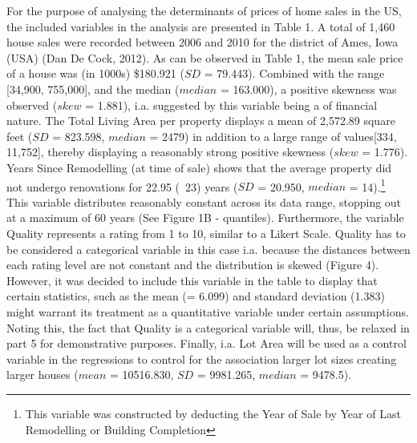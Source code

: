\documentclass[a4paper]{article}
\begin{document}
For the purpose of analysing the determinants of prices of home sales in the US, the included variables in the analysis are presented in Table 1. A total of 1,460 house sales were recorded between 2006 and 2010 for the district of Ames, Iowa (USA) (Dan De Cock, 2012). As can be observed in Table 1, the mean sale price of a house was (in 1000s) \$180.921 ($SD$ = 79.443). Combined with the range [34,900, 755,000], and the median ($median$ = 163.000), a positive skewness was observed ($skew$ = 1.881), i.a. suggested by this variable being a of financial nature. The Total Living Area per property displays a mean of 2,572.89 square feet ($SD$ = 823.598, $median$ = 2479) in addition to a large range of values[334, 11,752], thereby displaying a reasonably strong positive skewness ($skew$ = 1.776).  Years Since Remodelling (at time of sale) shows that the average property did not undergo renovations for 22.95 (~23) years ($SD$ = 20.950, $median$ = 14).\footnote{This variable was constructed by deducting the Year of Sale by Year of Last Remodelling or Building Completion} This variable distributes reasonably constant across its data range, stopping out at a maximum of 60 years (See Figure 1B - quantiles). Furthermore, the variable Quality represents a rating from 1 to 10, similar to a Likert Scale. Quality has to be considered a categorical variable in this case i.a. because the distances between each rating level are not constant and the distribution is skewed (Figure 4). However, it was decided to include this variable in the table to display that certain statistics, such as the mean (= 6.099) and standard deviation (1.383) might warrant its treatment as a quantitative variable under certain assumptions. Noting this, the fact that Quality is a categorical variable will, thus, be relaxed in part 5 for demonstrative purposes. Finally, i.a. Lot Area will be used as a control variable in the regressions to control for the association larger lot sizes creating larger houses ($mean$ = 10516.830, $SD$ = 9981.265, $median$ = 9478.5). 
\end{document}
